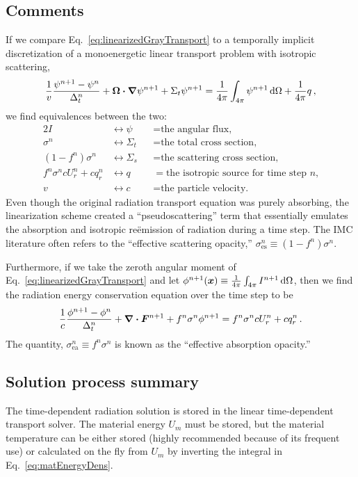 \subsection{Comments}\label{bgSIComments}
If we compare Eq.~\eqref{eq:linearizedGrayTransport} to a temporally implicit
discretization of a monoenergetic linear transport problem with isotropic
scattering,
\begin{equation*}
  \frac{1}{v} \frac{\psi^{n+1} - \psi^n}{\Delta_t^n} 
  + \bm{\Omega} \bm{\cdot} \bm{\nabla} \psi^{n+1}
 + \Sigma_t \psi^{n+1}
 = \frac{1}{4\pi} \int_{4\pi} \psi^{n+1}\mathop{}\!\mathrm{d} \Omega
  + \frac{1}{4\pi} q \,,
\end{equation*}
we find equivalences between the two:
\begin{alignat*}{2}
  I &\leftrightarrow \psi &&= \text{the angular flux,}
  \\
  \sigma^n &\leftrightarrow \Sigma_t &&= \text{the total cross section,}
  \\
  \left(1 - f^n\right) \sigma^n &\leftrightarrow \Sigma_s &&= \text{the scattering cross
  section,} 
  \\
  f^n \sigma^n c U_r^n + c q_r^n &\leftrightarrow q &&= \text{the isotropic source for time
  step $n$,}
  \\
  v   &\leftrightarrow c &&= \text{the particle velocity.}
\end{alignat*}
Even though the original radiation transport equation was purely
absorbing, the linearization scheme created a ``pseudoscattering''
term that essentially emulates the absorption and isotropic re\"emission of
radiation during a time step. The IMC literature often refers to the
``effective scattering opacity,''
$\sigma_\text{es}^n \equiv \left(1 - f^n\right) \sigma^n$.

Furthermore, if we take the zeroth angular moment of
Eq.~\eqref{eq:linearizedGrayTransport} and let $\phi^{n+1}(\bm{x}) \equiv
\frac{1}{4\pi} \int_{4\pi} I^{n+1}\mathop{}\!\mathrm{d} \Omega$, then we find the radiation
energy conservation equation over the time step to be
\begin{equation}\label{eq:semiImplicitZeroth}
  \frac{1}{c} \frac{\phi^{n+1} - \phi^n}{\Delta_t^n}
  + \bm{\nabla} \bm{\cdot} \bm{F}^{n+1} + f^n\sigma^n \phi^{n+1}
 =  f^n \sigma^n c U_r^n + c q_r^n\,.
\end{equation}
The quantity, $\sigma_\text{ea}^n \equiv f^n\sigma^n$ is known as the
``effective absorption opacity.''

\subsection{Solution process summary}
The time-dependent radiation solution is stored in the linear time-dependent
transport solver. The material energy $U_m$ must be stored, but the
material temperature can be either stored (highly recommended because of its
frequent use) or calculated on the fly from $U_m$ by inverting the integral in
Eq.~\eqref{eq:matEnergyDens}.


